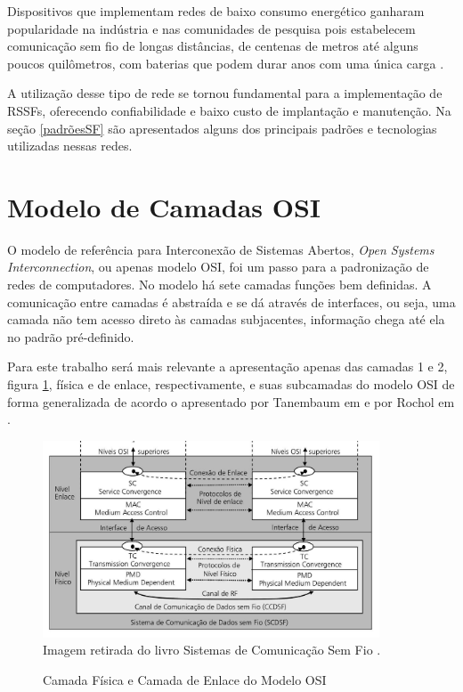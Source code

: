 Dispositivos que implementam redes de baixo consumo energético ganharam popularidade na indústria e nas comunidades de pesquisa pois estabelecem comunicação sem fio de longas distâncias, de centenas de metros até alguns poucos quilômetros, com baterias que podem durar anos com uma única carga \cite{mekki2019comparative}.

A utilização desse tipo de rede se tornou fundamental para a implementação de RSSFs, oferecendo confiabilidade e baixo custo de implantação e manutenção. Na seção \ref{padrõesSF} são apresentados alguns dos principais padrões e tecnologias utilizadas nessas redes.

\section{Modelo de Camadas OSI}
\label{osi}
O modelo de referência para Interconexão de Sistemas Abertos, \emph{Open Systems Interconnection}, ou apenas modelo OSI, foi um passo para a padronização de redes de computadores. No modelo há sete camadas funções bem definidas. A comunicação entre camadas é abstraída e se dá através de interfaces, ou seja, uma camada não tem acesso direto às camadas subjacentes, informação chega até ela no padrão pré-definido.

Para este trabalho será mais relevante a apresentação apenas das camadas 1 e 2, figura \ref{fig:modelo_osi_1e2}, física e de enlace, respectivamente, e suas subcamadas do modelo OSI de forma generalizada de acordo o apresentado por Tanembaum em \cite{tanembaum2011} e por Rochol em \cite{rochol2018sistemas}.

\begin{figure}[ht]
      \begin{center}
          \caption{Camada Física e Camada de Enlace do Modelo OSI}
          \includegraphics[width=10cm]{./sections/textual/chapters/images/modelo_osi_1e2.png}\\
          Imagem retirada do livro Sistemas de Comunicação Sem Fio \cite{rochol2018sistemas}.
          \label{fig:modelo_osi_1e2}
      \end{center}
  \end{figure}


